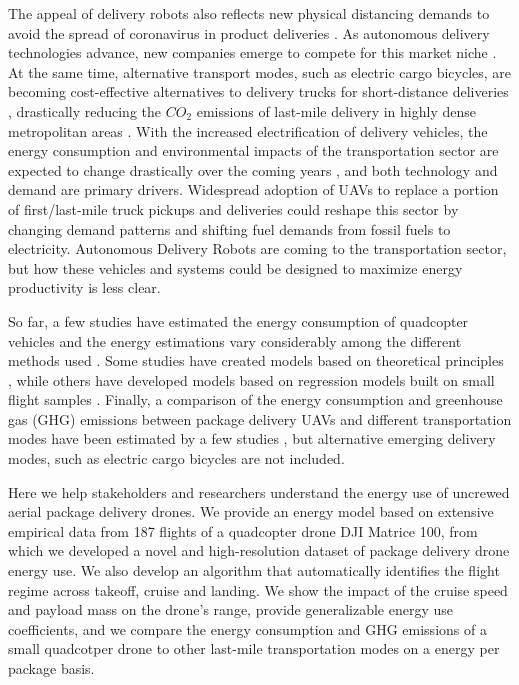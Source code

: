 \documentclass{article}
\begin{document}
The appeal of delivery robots also reflects new physical distancing demands to avoid the spread of coronavirus in product deliveries \cite{Abrar2020AnSystem}. As autonomous delivery technologies advance, new companies emerge to compete for this market niche \cite{Joerss2016HowMcKinsey, Bensinger2016AmazonsFedEx, Gross2013, Murphy2016, UPS2017}. At the same time, alternative transport modes, such as electric cargo bicycles, are becoming cost-effective alternatives to delivery trucks for short-distance deliveries \cite{Sheth2019MeasuringAreas}, drastically reducing the $CO_2$ emissions of last-mile delivery in highly dense metropolitan areas \cite{McLeod2020QuantifyingDelivery}. With the increased electrification of delivery vehicles, the energy consumption and environmental impacts of the transportation sector are expected to change drastically over the coming years \cite{Gebeloff2017, Dominkovic2018TheTransition}, and both technology and demand are primary drivers. Widespread adoption of UAVs to replace a portion of first/last-mile truck pickups and deliveries could reshape this sector by changing demand patterns and shifting fuel demands from fossil fuels to electricity. Autonomous Delivery Robots are coming to the transportation sector, but how these vehicles and systems could be designed to maximize energy productivity is less clear.

So far, a few studies have estimated the energy consumption of quadcopter vehicles and the energy estimations vary considerably among the different methods used \cite{Zhang2021EnergyAssessment}. Some studies have created models based on theoretical principles \cite{DAndrea2014GuestDeliver, Figliozzi2017LifecycleEmissions, Dorling2016VehicleDelivery, Liu2017, Lohn2018TheBuzz, Stolaroff2018EnergyDelivery, Jeong2019Truck-droneZones,Torabbeigi2019, Kirschstein2020ComparisonServices}, while others have developed models based on regression models built on small flight samples \cite{Dorling2016VehicleDelivery, Tseng2017AutonomousDrones, Tseng2017FlightDrones, Jeong2019Truck-droneZones}. Finally, a comparison of the energy consumption and greenhouse gas (GHG) emissions between package delivery UAVs and different transportation modes have been estimated by a few studies \cite{Stolaroff2018EnergyDelivery, Figliozzi2020CarbonVehicles, Goodchild2018DeliveryIndustry, Borlaug2021Heavy-dutySystems}, but alternative emerging delivery modes, such as electric cargo bicycles are not included. 


Here we help stakeholders and researchers understand the energy use of uncrewed aerial package delivery drones. We provide an energy model based on extensive empirical data from 187 flights of a quadcopter drone DJI Matrice 100, from which we developed a novel and high-resolution dataset \cite{Rodrigues2020a} of package delivery drone energy use. We also develop an algorithm that automatically identifies the flight regime across takeoff, cruise and landing. We show the impact of the cruise speed and payload mass on the drone's range, provide generalizable energy use coefficients, and we compare the energy consumption and GHG emissions of a small quadcotper drone to other last-mile transportation modes on a energy per package basis.      
\end{document}
